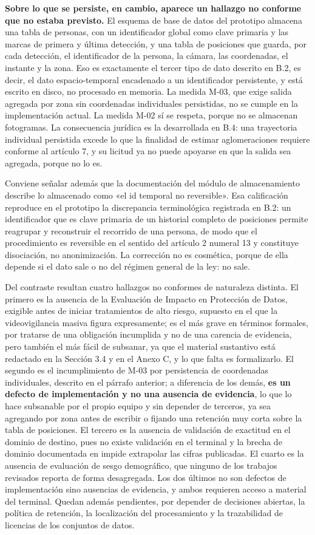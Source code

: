\textbf{Sobre lo que se persiste, en cambio, aparece un hallazgo no
conforme que no estaba previsto.} El esquema de base de datos del
prototipo almacena una tabla de personas, con un identificador global
como clave primaria y las marcas de primera y última detección, y una
tabla de posiciones que guarda, por cada detección, el identificador de
la persona, la cámara, las coordenadas, el instante y la zona. Eso es
exactamente el tercer tipo de dato descrito en B.2, es decir, el dato
espacio-temporal encadenado a un identificador persistente, y está
escrito en disco, no procesado en memoria. La medida M-03, que exige
salida agregada por zona sin coordenadas individuales persistidas, no se
cumple en la implementación actual. La medida M-02 sí se respeta, porque
no se almacenan fotogramas. La consecuencia jurídica es la desarrollada
en B.4: una trayectoria individual persistida excede lo que la finalidad
de estimar aglomeraciones requiere conforme al artículo 7, y su licitud
ya no puede apoyarse en que la salida sea agregada, porque no lo es.

Conviene señalar además que la documentación del módulo de
almacenamiento describe lo almacenado como «el id temporal no
reversible». Esa calificación reproduce en el prototipo la discrepancia
terminológica registrada en B.2: un identificador que es clave primaria
de un historial completo de posiciones permite reagrupar y reconstruir
el recorrido de una persona, de modo que el procedimiento es reversible
en el sentido del artículo 2 numeral 13 y constituye disociación, no
anonimización. La corrección no es cosmética, porque de ella depende si
el dato sale o no del régimen general de la ley: no sale.

Del contraste resultan cuatro hallazgos no conformes de naturaleza
distinta. El primero es la ausencia de la Evaluación de Impacto en
Protección de Datos, exigible antes de iniciar tratamientos de alto
riesgo, supuesto en el que la videovigilancia masiva figura
expresamente; es el más grave en términos formales, por tratarse de una
obligación incumplida y no de una carencia de evidencia, pero también el
más fácil de subsanar, ya que el material sustantivo está redactado en
la Sección 3.4 y en el Anexo C, y lo que falta es formalizarlo. El
segundo es el incumplimiento de M-03 por persistencia de coordenadas
individuales, descrito en el párrafo anterior; a diferencia de los
demás, \textbf{es un defecto de implementación y no una ausencia de
evidencia}, lo que lo hace subsanable por el propio equipo y sin
depender de terceros, ya sea agregando por zona antes de escribir o
fijando una retención muy corta sobre la tabla de posiciones. El tercero
es la ausencia de validación de exactitud en el dominio de destino, pues
no existe validación en el terminal y la brecha de dominio documentada
en \cite{Lin_2025_CVPR} impide extrapolar las cifras publicadas. El
cuarto es la ausencia de evaluación de sesgo demográfico, que ninguno de
los trabajos revisados reporta de forma desagregada. Los dos últimos no
son defectos de implementación sino ausencias de evidencia, y ambos
requieren acceso a material del terminal. Quedan además pendientes, por
depender de decisiones abiertas, la política de retención, la
localización del procesamiento y la trazabilidad de licencias de los
conjuntos de datos.
